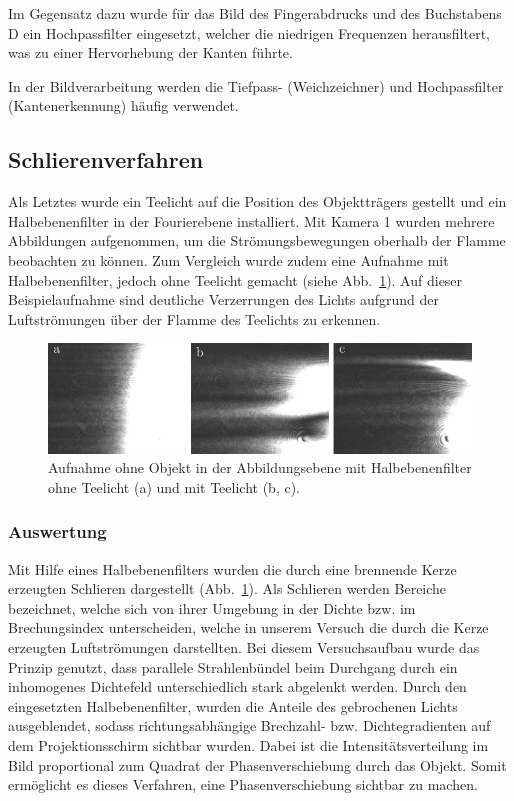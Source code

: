 Im Gegensatz dazu wurde für das Bild des Fingerabdrucks und des Buchstabens D ein Hochpassfilter eingesetzt, welcher die niedrigen Frequenzen herausfiltert, was zu einer Hervorhebung der Kanten führte.

In der Bildverarbeitung werden die Tiefpass- (Weichzeichner) und Hochpassfilter (Kantenerkennung) häufig verwendet.


\subsection{Schlierenverfahren}

Als Letztes wurde ein Teelicht auf die Position des Objektträgers gestellt und ein Halbebenenfilter in der Fourierebene installiert. Mit Kamera 1 wurden mehrere Abbildungen aufgenommen, um die Strömungsbewegungen oberhalb der Flamme beobachten zu können. Zum Vergleich wurde zudem eine Aufnahme mit Halbebenenfilter, jedoch ohne Teelicht gemacht (siehe Abb.~\ref{fig:Halbebenenfilter_mit_und_ohne_Teelicht}). Auf dieser Beispielaufnahme sind deutliche Verzerrungen des Lichts aufgrund der Luftströmungen über der Flamme des Teelichts zu erkennen. 

\begin{figure}[h]
	\centering
	\includegraphics{images/ergebniss_Teelicht/abb.pdf}
	\caption[Schlieren]{
		Aufnahme ohne Objekt in der Abbildungsebene mit Halbebenenfilter ohne Teelicht (a) und mit Teelicht (b, c).
	}
	\label{fig:Halbebenenfilter_mit_und_ohne_Teelicht}
\end{figure}


\subsubsection*{Auswertung}

Mit Hilfe eines Halbebenenfilters wurden die durch eine brennende Kerze erzeugten Schlieren dargestellt (Abb.~\ref{fig:Halbebenenfilter_mit_und_ohne_Teelicht}). Als Schlieren werden Bereiche bezeichnet, welche sich von ihrer Umgebung in der Dichte  bzw. im Brechungsindex unterscheiden, welche in unserem Versuch die durch  die Kerze erzeugten Luftströmungen darstellten. Bei diesem Versuchsaufbau  wurde das Prinzip genutzt, dass parallele Strahlenbündel beim  Durchgang durch ein inhomogenes Dichtefeld unterschiedlich stark abgelenkt werden.   Durch den eingesetzten Halbebenenfilter, wurden die Anteile des gebrochenen  Lichts ausgeblendet, sodass richtungsabhängige Brechzahl- bzw. Dichtegradienten auf dem Projektionsschirm sichtbar wurden. Dabei ist die Intensitätsverteilung im Bild proportional zum Quadrat der Phasenverschiebung durch das Objekt. Somit ermöglicht es dieses Verfahren, eine Phasenverschiebung sichtbar zu machen. 
